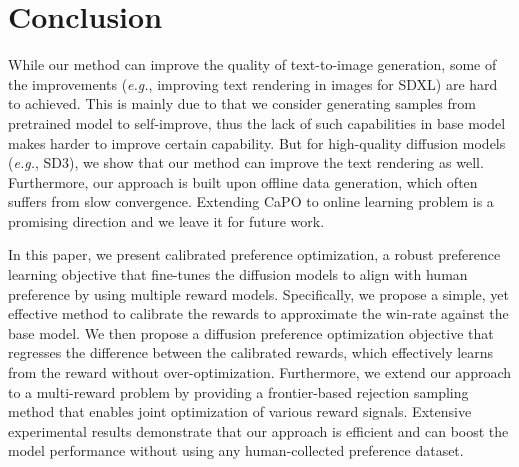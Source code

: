 \section{Conclusion}
\label{sec:conclusion}
While our method can improve the quality of text-to-image generation, some of the improvements (\emph{e.g.}, improving text rendering in images for SDXL) are hard to achieved. This is mainly due to that we consider generating samples from pretrained model to self-improve, thus the lack of such capabilities in base model makes harder to improve certain capability. But for high-quality diffusion models (\emph{e.g.}, SD3), we show that our method can improve the text rendering as well. Furthermore, our approach is built upon offline data generation, which often suffers from slow convergence. Extending CaPO to online learning problem is a promising direction and we leave it for future work.
\fi


In this paper, we present calibrated preference optimization, a robust preference learning objective that fine-tunes the diffusion models to align with human preference by using multiple reward models. 
Specifically, we propose a simple, yet effective method to calibrate the rewards to approximate the win-rate against the base model.
We then propose a diffusion preference optimization objective that regresses the difference between the calibrated rewards, which effectively learns from the reward without over-optimization. Furthermore, we extend our approach to a multi-reward problem by providing a frontier-based rejection sampling method that enables joint optimization of various reward signals. 
Extensive experimental results demonstrate that our approach is efficient and can boost the model performance without using any human-collected preference dataset.